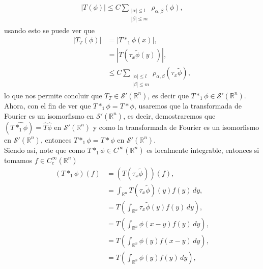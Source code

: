 \begin{homeworkProblem}
\begin{solution}
      \begin{align*}
        |T(\phi)|\leq C\sum_{\substack{|\alpha|\leq l\\ |\beta|\leq m}}\rho_{\alpha,\beta}(\phi),
      \end{align*}
      usando esto se puede ver que
      \begin{align*}
        |T_{T}(\phi)|&=\left| T*_{1}\phi(x) \right|,\\
        &=\left| T\left( \tau_{x}\tilde{\phi}(y) \right) \right|,\\
        &\leq C\sum_{\substack{|\alpha|\leq l\\|\beta|\leq m}}\rho_{\alpha,\beta}(\tau_{x}\tilde{\phi}),
      \end{align*}
      lo que nos permite concluir que $T_{T}\in\mathcal{S}'(\mathbb{R}^{n})$, es decir que $T*_{1}\phi\in\mathcal{S}'(\mathbb{R}^{n})$.\\
      Ahora, con el fin de ver que $T*_{1}\phi=T*\phi$, usaremos que la transformada de Fourier es un isomorfismo en $\mathcal{S}'(\mathbb{R}^{n})$, es decir, demostraremos que $\left(\hat{T*_{1}\phi}\right)=\hat{T}\hat{\phi}$ en $\mathcal{S}'(\mathbb{R}^{n})$ y como la transformada de Fourier es un isomorfismo en $\mathcal{S}'(\mathbb{R}^{n})$, entonces $T*_{1}\phi=T*\phi$ en $\mathcal{S}'(\mathbb{R}^{n})$.\\
      Siendo así, note que como $T*_{1}\phi\in C^{\infty}(\mathbb{R}^{n})$ es localmente integrable, entonces si tomamos $f\in C^{\infty}_{c}(\mathbb{R}^{n})$
      \begin{align*}
        \left( T*_{1}\phi \right)(f)&=\left( T(\tau_{x}\tilde{\phi}) \right)(f),\\
        &=\int_{\mathbb{R}^{n}}T(\tau_{x}\tilde{\phi})(y)f(y)\, dy,\\
        &=T\left( \int_{\mathbb{R}^{n}}\tau_{x}\tilde{\phi}(y)f(y)\, dy \right),\\
        &=T\left( \int_{\mathbb{R}^{n}}\phi(x-y)f(y)\, dy \right),\\
        &=T\left( \int_{\mathbb{R}^{n}}\phi(y)f(x-y)\, dy \right),\\
        &=T\left( \int_{\mathbb{R}^{n}}\phi(y)f(y)\, dy \right),\\
      \end{align*}
  \end{solution}
\end{homeworkProblem}
